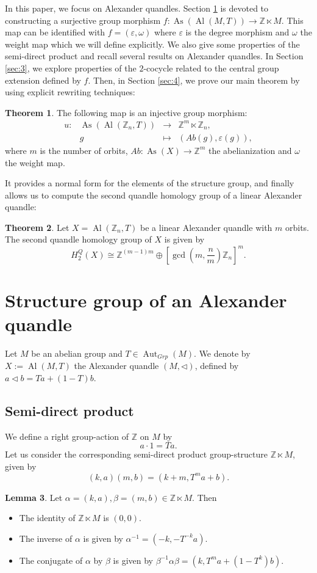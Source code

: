 \documentclass[a4paper,11pt]{amsart}
\theoremstyle{definition}
\newtheorem{thm}{Theorem}
\newtheorem{lem}[thm]{Lemma}
\newcommand{\Z}{{\mathbb Z}}
\DeclareMathOperator{\Aut}{Aut}
\DeclareMathOperator{\Al}{Al}
\DeclareMathOperator{\As}{As}
\newcommand{\znz}[1]{\Z_{#1}}
\begin{document}
In this paper, we focus on Alexander quandles.
Section \ref{sec:2} is devoted to constructing a surjective group morphism $f\colon\As(\Al(M,T)) \to \Z\ltimes M$. This map can be identified with $f=(\varepsilon,\omega)$ where $\varepsilon$ is the degree morphism and $\omega$ the weight map which we will define explicitly.
We also give some properties of the semi-direct product and recall several results on Alexander quandles.
In Section \ref{sec:3}, we explore properties of the $2$-cocycle related to the central group extension defined by $f$.
Then, in Section \ref{sec:4}, we prove our main theorem by using explicit rewriting techniques:
\begin{thm}
The following map is an injective group morphism:
\[\begin{array}{cccc}
u\colon& \As(\Al(\znz{n},T)) & \longrightarrow & \Z^m\ltimes \znz{n},\\
&g & \longmapsto & (Ab(g), \varepsilon(g)),
\end{array}\]
where $m$ is the number of orbits, $Ab:\As(X) \to \Z^m$ the abelianization and $\omega$ the weight map.
\end{thm}
It provides a normal form for the elements of the structure group, and finally allows us to compute the second quandle homology group of a linear Alexander quandle:
\begin{thm}
Let $X=\Al(\znz{n},T)$ be a linear Alexander quandle with $m$ orbits. The second quandle homology group of $X$ is given by
\[
H_2^Q(X) \cong \Z^{(m-1)m} \oplus \left[\gcd\left(m,\frac{n}{m}\right)\znz{n} \right]^m.
\]
\end{thm}

\section{Structure group of an Alexander quandle}\label{sec:2}
Let $M$ be an abelian group and $T\in \Aut_{Grp}(M)$.
We denote by $X:= \Al(M,T)$ the Alexander quandle $(M,\lhd)$, defined by $a\lhd b = Ta + (1-T)b$.
\subsection{Semi-direct product}
We define a right group-action of $\Z$ on $M$ by
$$a \cdot 1 = Ta.$$
Let us consider the corresponding semi-direct product group-structure $\Z \ltimes M$, given by
$$(k,a)(m,b) = (k+m, T^m a + b).$$

\begin{lem}
Let $\alpha = (k,a), \beta=(m,b)\in \Z \ltimes M$. Then
\begin{itemize}
\item The identity of $\Z \ltimes M$ is $(0,0)$.
\item The inverse of $\alpha$ is given by $\alpha^{-1} = (-k, -T^{-k} a)$.
\item The conjugate of $\alpha$ by $\beta$ is given by $\beta^{-1} \alpha \beta = (k, T^m a + (1-T^k) b)$.
\end{itemize}
\end{lem}
\end{document}
